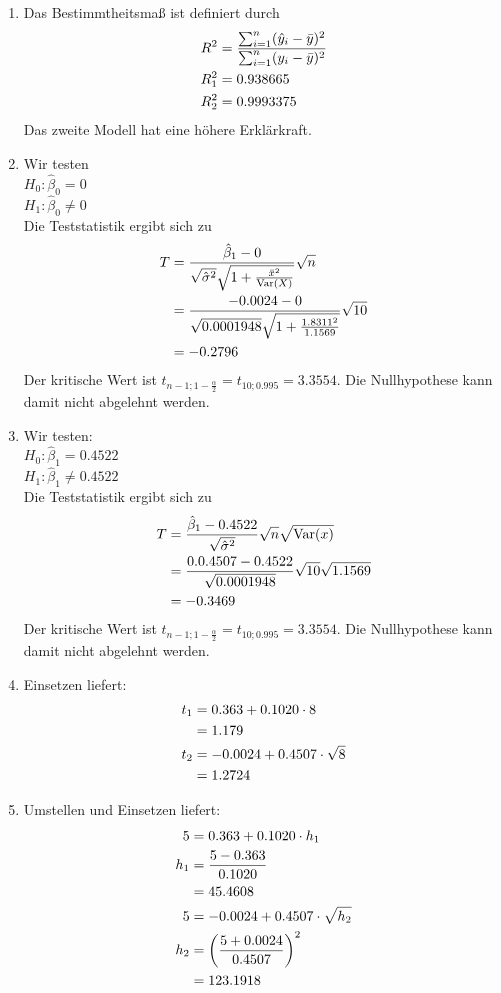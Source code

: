 \documentclass{article}
\DeclareMathOperator{\Var}{Var}
\begin{document}
	\begin{enumerate}[label=(\alph*)]
		\item Das Bestimmtheitsmaß ist definiert durch
		\begin{align}
			R^2 &= \frac{\sum_{i=1}^n (\hat{y}_i-\bar{y})^2}{\sum_{i=1}^n (y_i-\bar{y})^2} \notag \\
			R_1^2 &= 0.938665 \notag \\
			R_2^2 &= 0.9993375 \notag
		\end{align}
		Das zweite Modell hat eine höhere Erklärkraft.
		\item Wir testen \\
		$H_0: \hat{\beta}_0 =0$ \\
		$H_1: \hat{\beta}_0 \neq 0$ \\
		Die Teststatistik ergibt sich zu
		\begin{align}
			T &= \frac{\hat{\beta}_1 - 0}{\sqrt{\hat{\sigma}^2}\sqrt{1+\frac{\bar{x}^2}{\Var(X)}}}\sqrt{n} \notag \\
			&= \frac{-0.0024-0}{\sqrt{0.0001948}\sqrt{1+\frac{1.8311^2}{1.1569}}}\sqrt{10} \notag \\
			&= -0.2796 \notag
		\end{align}
		Der kritische Wert ist $t_{n-1;1-\frac{\alpha}{2}}=t_{10;0.995}=3.3554$. Die Nullhypothese kann damit nicht abgelehnt werden.
		\item Wir testen: \\
		$H_0: \hat{\beta}_1 = 0.4522$ \\
		$H_1: \hat{\beta}_1 \neq 0.4522$ \\
		Die Teststatistik ergibt sich zu
		\begin{align}
			T &= \frac{\hat{\beta}_1 - 0.4522}{\sqrt{\hat{\sigma}^2}}\sqrt{n}\sqrt{\Var(x)} \notag \\
			&= \frac{0.0.4507-0.4522}{\sqrt{0.0001948}}\sqrt{10}\sqrt{1.1569} \notag \\
			&= -0.3469 \notag
		\end{align}
		Der kritische Wert ist $t_{n-1;1-\frac{\alpha}{2}}=t_{10;0.995}=3.3554$. Die Nullhypothese kann damit nicht abgelehnt werden.
		\item Einsetzen liefert:
		\begin{align}
			t_1 &= 0.363 + 0.1020 \cdot 8 \notag \\
			&= 1.179 \notag \\
			t_2 &= -0.0024 + 0.4507 \cdot \sqrt{8} \notag \\
			&= 1.2724 \notag
		\end{align}
		\item Umstellen und Einsetzen liefert:
		\begin{align}
			5 &= 0.363 + 0.1020 \cdot h_1 \notag \\
			h_1 &= \frac{5-0.363}{0.1020} \notag \\
			&= 45.4608 \notag \\
			5 &= -0.0024 + 0.4507 \cdot \sqrt{h_2} \notag \\
			h_2 &= \left(\frac{5+0.0024}{0.4507}\right)^2 \notag \\
			&= 123.1918 \notag
		\end{align}
	\end{enumerate}
\end{document}
